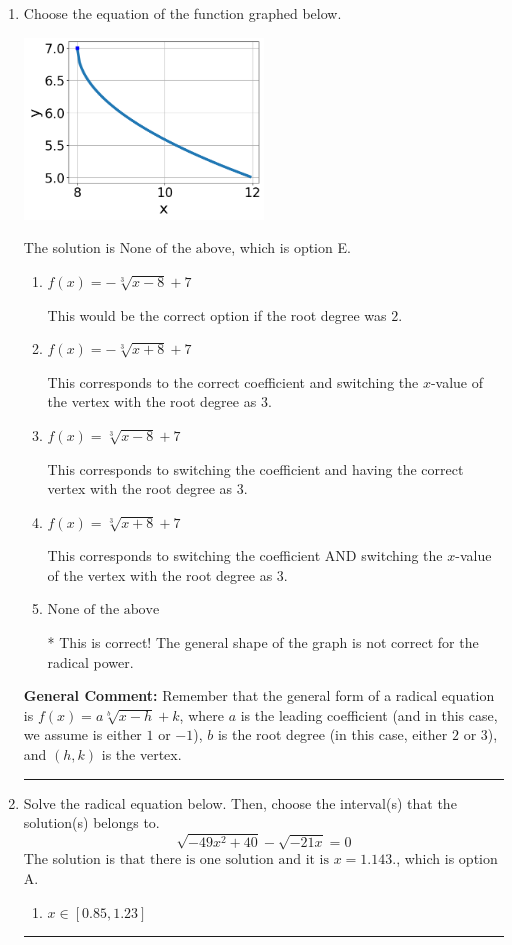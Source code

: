 \documentclass{extbook}[14pt]
\newcommand{\litem}[1]{\item #1

\rule{\textwidth}{0.4pt}}
\begin{document}
\begin{enumerate}\litem{
Choose the equation of the function graphed below.

\begin{center}
    \includegraphics[width=0.5\textwidth]{../Figures/radicalGraphToEquationA.png}
\end{center}


The solution is \( \text{None of the above} \), which is option E.\begin{enumerate}[label=\Alph*.]
\item \( f(x) = - \sqrt[3]{x - 8} + 7 \)

This would be the correct option if the root degree was $2$.
\item \( f(x) = - \sqrt[3]{x + 8} + 7 \)

This corresponds to the correct coefficient and switching the $x$-value of the vertex with the root degree as $3$.
\item \( f(x) = \sqrt[3]{x - 8} + 7 \)

This corresponds to switching the coefficient and having the correct vertex with the root degree as $3$.
\item \( f(x) = \sqrt[3]{x + 8} + 7 \)

This corresponds to switching the coefficient AND switching the $x$-value of the vertex with the root degree as $3$.
\item \( \text{None of the above} \)

* This is correct! The general shape of the graph is not correct for the radical power.
\end{enumerate}

\textbf{General Comment:} Remember that the general form of a radical equation is $ f(x) = a \sqrt[b]{x - h} + k$, where $a$ is the leading coefficient (and in this case, we assume is either $1$ or $-1$), $b$ is the root degree (in this case, either $2$ or $3$), and $(h, k)$ is the vertex.
}
\litem{
Solve the radical equation below. Then, choose the interval(s) that the solution(s) belongs to.
\[ \sqrt{-49 x^2 + 40} - \sqrt{-21 x} = 0 \]The solution is \( \text{that there is one solution and it is } x = 1.143. \), which is option A.\begin{enumerate}[label=\Alph*.]
\item \( x \in [0.85,1.23] \)


\end{enumerate}}
\end{enumerate}
\end{document}
